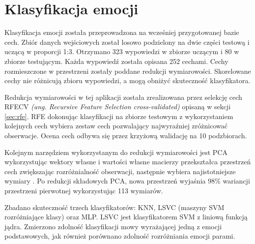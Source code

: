 \documentclass[a4paper,12pt,twoside,openany]{report}
\newcommand{\ang}[1]{\textit{(ang. #1)}}
\begin{document}
\section{Klasyfikacja emocji}
Klasyfikacja emocji została przeprowadzona na wcześniej przygotowanej bazie cech.
Zbiór danych wejściowych został losowo podzielony na dwie części testową i uczącą w proporcji 1:3.
Otrzymano 323 wypowiedzi w zbiorze uczącym i 80 w zbiorze testującym.
Każda wypowiedź została opisana 252 cechami.
Cechy rozmieszczone w przestrzeni zostały poddane redukcji wymiarowości. 
Skorelowane cechy nie różnicują zbioru wypowiedzi, a mogą obniżyć skuteczność klasyfikatora.

Redukcja wymiarowości w tej aplikacji została zrealizowana przez selekcję cech RFECV \ang{Recursive Feature Selection cross-validated} \cite{Guyon2002}
opisaną w sekcji \ref{sec:rfe}.
RFE dokonując klasyfikacji na zbiorze testowym z wykorzystaniem kolejnych cech wybiera zestaw cech pozwalający najwyraźniej zróżnicować obserwacje.
Ocena cech odbywa się przez krzyżową walidację na 10 podzbiorach.


Kolejnym narzędziem wykorzystanym do redukcji wymiarowości jest PCA wykorzystując wektory własne i wartości własne macierzy
przekształca przestrzeń cech zwiększając rozróżnialność obserwacji, następnie wybiera najistotniejsze wymiary \cite{Bro2014}.
Po redukcji składowych PCA, nowa przestrzeń wyjaśnia 98\% wariancji przestrzeni pierwotnej wykorzystując 113 wymiarów.

Zbadano skuteczność trzech klasyfikatorów: KNN, LSVC (maszyny SVM rozróżniające klasy) oraz MLP.
LSVC jest klasyfikatorem SVM z liniową funkcją jądra.
Zmierzono zdolność klasyfikacji mowy wyrażającej jedną z emocji podstawowych, jak również porównano zdolność rozróżniania emocji parami.
\end{document}
